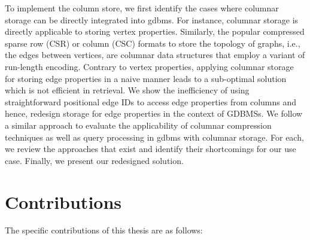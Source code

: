 To implement the column store, we first identify the cases where columnar storage can be directly integrated into \gls{gdbms}. For instance, columnar storage is directly applicable to storing vertex properties. Similarly, the popular compressed sparse row (CSR) or column (CSC) formats to store the topology of graphs, i.e., the edges between vertices, are columnar data structures that employ a variant of run-length encoding. Contrary to vertex properties, applying columnar storage for storing edge properties in a naive manner leads to a sub-optimal solution which is not efficient in retrieval. We show the inefficiency of using straightforward positional edge IDs to access edge properties from columns and hence, redesign storage for edge properties in the context of GDBMSs. We follow a similar approach to evaluate the applicability of columnar compression techniques as well as query processing in \gls{gdbms} with columnar storage. For each, we review the approaches that exist and identify their shortcomings for our use case. Finally, we present our redesigned solution. 

\section{Contributions}

The specific contributions of this thesis are as follows:

